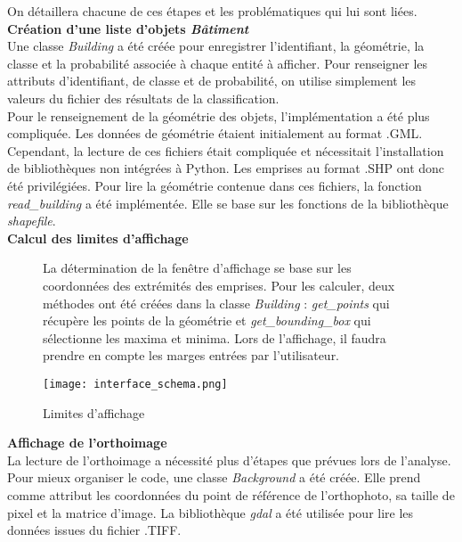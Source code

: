 \noindent On détaillera chacune de ces étapes et les problématiques qui lui sont liées.\\

\noindent\textbf{Création d'une liste d'objets \textit{Bâtiment}}\\

Une classe \textit{Building} a été créée pour enregistrer l'identifiant, la géométrie, la classe et la probabilité associée à chaque entité à afficher. Pour renseigner les attributs d'identifiant, de classe et de probabilité, on utilise simplement les valeurs du fichier des résultats de la classification.\\

Pour le renseignement de la géométrie des objets, l'implémentation a été plus compliquée. Les données de géométrie étaient initialement au format .GML. Cependant, la lecture de ces fichiers était compliquée et nécessitait l'installation de bibliothèques non intégrées à Python. Les emprises au format .SHP ont donc été privilégiées. Pour lire la géométrie contenue dans ces fichiers, la fonction \textit{read\_building} a été implémentée. Elle se base sur les fonctions de la bibliothèque \textit{shapefile}.\\

\noindent\textbf{Calcul des limites d'affichage}\\
\begin{figure}[!h]
	\begin{minipage}{0.45\linewidth}\parindent12pt
		\indent  La détermination de la fenêtre d'affichage se base sur les coordonnées des extrémités des emprises. Pour les calculer, deux méthodes ont été créées dans la classe \textit{Building} : \textit{get\_points} qui récupère les points de la géométrie et \textit{get\_bounding\_box} qui sélectionne les maxima et minima. Lors de l'affichage, il faudra prendre en compte les marges entrées par l'utilisateur.
	\end{minipage}
	\hfill
	\begin{minipage}{0.50\linewidth}
		\centering
		\texttt{[image: interface\_schema.png]}  \\
		\caption[Limites d'affichage]{Limites d'affichage}
		\label{fig:interfschema}
	\end{minipage}
\end{figure}


\noindent\textbf{Affichage de l'orthoimage}\\

La lecture de l'orthoimage a nécessité plus d'étapes que prévues lors de l'analyse. Pour mieux organiser le code, une classe \textit{Background} a été créée. Elle prend comme attribut les coordonnées du point de référence de l'orthophoto, sa taille de pixel et la matrice d'image. La bibliothèque \textit{gdal} a été utilisée pour lire les données issues du fichier .TIFF.\\

